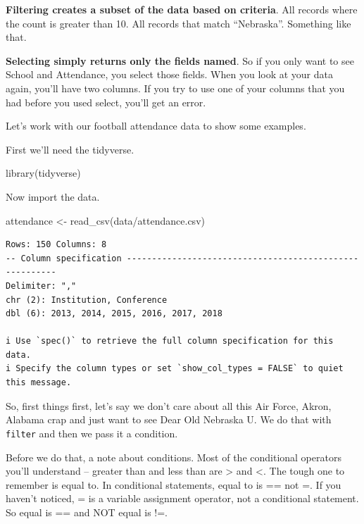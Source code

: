 \documentclass[
  letterpaper,
  DIV=11,
  numbers=noendperiod]{scrreprt}
\newenvironment{Shaded}{\begin{snugshade}}{\end{snugshade}}
\newcommand{\FunctionTok}[1]{\textcolor[rgb]{0.28,0.35,0.67}{#1}}
\newcommand{\NormalTok}[1]{\textcolor[rgb]{0.00,0.23,0.31}{#1}}
\newcommand{\OtherTok}[1]{\textcolor[rgb]{0.00,0.23,0.31}{#1}}
\newcommand{\StringTok}[1]{\textcolor[rgb]{0.13,0.47,0.30}{#1}}
\begin{document}
\textbf{Filtering creates a subset of the data based on criteria}. All
records where the count is greater than 10. All records that match
``Nebraska''. Something like that.

\textbf{Selecting simply returns only the fields named}. So if you only
want to see School and Attendance, you select those fields. When you
look at your data again, you'll have two columns. If you try to use one
of your columns that you had before you used select, you'll get an
error.

Let's work with our football attendance data to show some examples.

First we'll need the tidyverse.

\begin{Shaded}
\begin{Highlighting}[]
\FunctionTok{library}\NormalTok{(tidyverse)}
\end{Highlighting}
\end{Shaded}

Now import the data.

\begin{Shaded}
\begin{Highlighting}[]
\NormalTok{attendance }\OtherTok{\textless{}{-}} \FunctionTok{read\_csv}\NormalTok{(}\StringTok{\textquotesingle{}data/attendance.csv\textquotesingle{}}\NormalTok{)}
\end{Highlighting}
\end{Shaded}

\begin{verbatim}
Rows: 150 Columns: 8
-- Column specification --------------------------------------------------------
Delimiter: ","
chr (2): Institution, Conference
dbl (6): 2013, 2014, 2015, 2016, 2017, 2018

i Use `spec()` to retrieve the full column specification for this data.
i Specify the column types or set `show_col_types = FALSE` to quiet this message.
\end{verbatim}

So, first things first, let's say we don't care about all this Air
Force, Akron, Alabama crap and just want to see Dear Old Nebraska U. We
do that with \texttt{filter} and then we pass it a condition.

Before we do that, a note about conditions. Most of the conditional
operators you'll understand -- greater than and less than are
\textgreater{} and \textless. The tough one to remember is equal to. In
conditional statements, equal to is == not =. If you haven't noticed, =
is a variable assignment operator, not a conditional statement. So equal
is == and NOT equal is !=.
\end{document}
